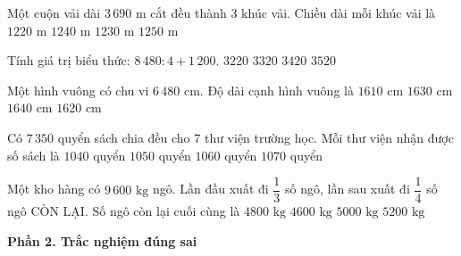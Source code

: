 \begin{ex} %
Một cuộn vải dài $3\,690\text{ m}$ cắt đều thành 3 khúc vải. Chiều dài mỗi khúc vải là
\choice
{$1220\text{ m}$}
{$1240\text{ m}$}
{\True $1230\text{ m}$}
{$1250\text{ m}$}
\end{ex}

\begin{ex} %
Tính giá trị biểu thức: $8\,480 : 4 + 1\,200$.
\choice
{$3220$}
{\True $3320$}
{$3420$}
{$3520$}
\end{ex}

\begin{ex} %
Một hình vuông có chu vi $6\,480\text{ cm}$. Độ dài cạnh hình vuông là
\choice
{$1610\text{ cm}$}
{$1630\text{ cm}$}
{$1640\text{ cm}$}
{\True $1620\text{ cm}$}
\end{ex}

\begin{ex} %
Có $7\,350$ quyển sách chia đều cho 7 thư viện trường học. Mỗi thư viện nhận được số sách là
\choice
{$1040$ quyển}
{\True $1050$ quyển}
{$1060$ quyển}
{$1070$ quyển}
\end{ex}

\begin{ex} %
Một kho hàng có $9\,600\text{ kg}$ ngô. Lần đầu xuất đi $\dfrac{1}{3}$ số ngô, lần sau xuất đi $\dfrac{1}{4}$ số ngô CÒN LẠI. Số ngô còn lại cuối cùng là
\choice
{\True $4800\text{ kg}$}
{$4600\text{ kg}$}
{$5000\text{ kg}$}
{$5200\text{ kg}$}
\end{ex}

\textbf{Phần 2. Trắc nghiệm đúng sai}


